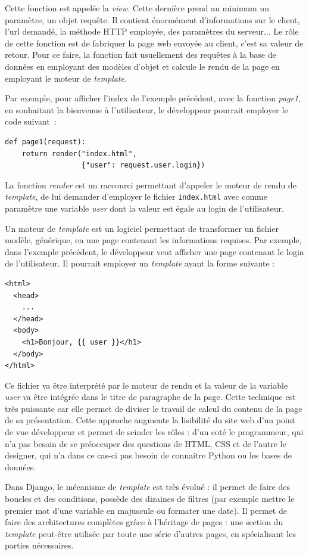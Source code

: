 \documentclass[a4paper,12pt]{article}
\begin{document}
Cette fonction est appelée la \textit{view}. Cette dernière prend au minimum un paramètre,
un objet requête. Il contient énormément d'informations sur le client, l'url demandé,
la méthode HTTP employée, des paramètres du serveur... Le rôle de cette fonction
est de fabriquer la page web envoyée au client, c'est sa valeur de retour. Pour ce faire,
la fonction fait usuellement des requêtes à la base de données en employant des modèles
d'objet et calcule le rendu de la page en employant le moteur de \textit{template}.

Par exemple, pour afficher l'index de l'exemple précédent, avec la fonction \textit{page1},
en souhaitant la bienvenue à l'utilisateur, le développeur pourrait employer le code
suivant~:

\begin{verbatim}
def page1(request):
    return render("index.html",
                  {"user": request.user.login})
\end{verbatim}

La fonction \textit{render} est un raccourci permettant d'appeler le moteur
de rendu de \textit{template}, de lui demander d'employer le fichier \texttt{index.html}
avec comme paramètre une variable \textit{user} dont la valeur est égale
au login de l'utilisateur.

Un moteur de \textit{template} est un logiciel permettant de transformer un fichier
modèle, générique, en une page contenant les informations requises. Par exemple,
dans l'exemple précédent, le développeur veut afficher une page contenant le
login de l'utilisateur. Il pourrait employer un \textit{template} ayant
la forme suivante : 

\begin{verbatim}
<html>
  <head>
    ...
  </head>
  <body>
    <h1>Bonjour, {{ user }}</h1>
  </body>
</html>
\end{verbatim}

Ce fichier va être interprété par le moteur de rendu et la valeur de la variable
\textit{user} va être intégrée dans le titre de paragraphe de la page. Cette
technique est très puissante car elle permet de diviser le travail de calcul
du contenu de la page de sa présentation. Cette approche augmente la lisibilité
du site web d'un point de vue développeur et permet de scinder les rôles : d'un
coté le programmeur, qui n'a pas besoin de se préoccuper des questions
de HTML, CSS et de l'autre le designer, qui n'a dans ce cas-ci pas
besoin de connaitre Python ou les bases de données.

Dans Django, le mécanisme de \textit{template} est très évolué : il permet
de faire des boucles et des conditions, possède des dizaines de filtres (par
exemple mettre le premier mot d'une variable en majuscule ou formater une date).
Il permet de faire des architectures complètes grâce à l'héritage de pages :
une section du \textit{template} peut-être utilisée par toute une série d'autres
pages, en spécialisant les parties nécessaires.
\end{document}
